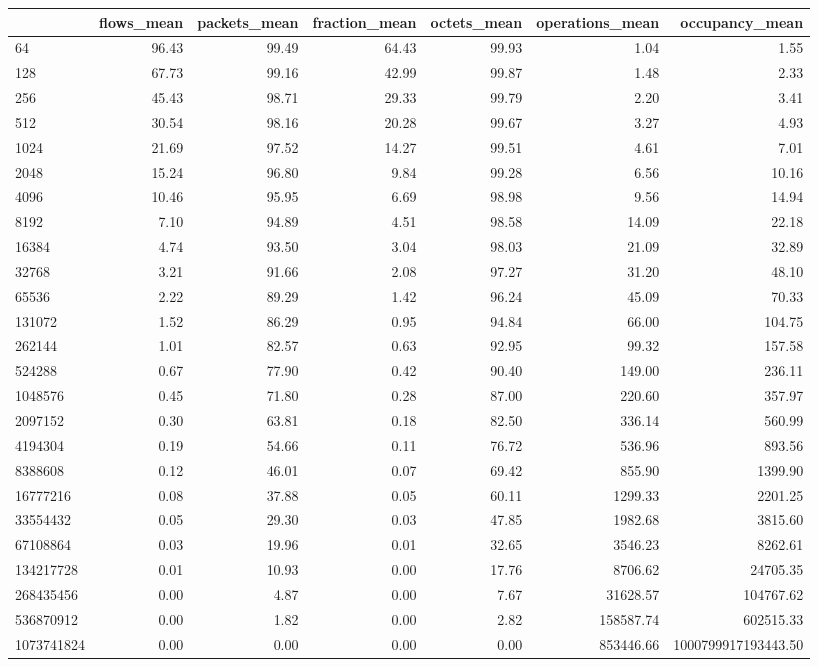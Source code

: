 \begin{tabular}{lrrrrrr}
\toprule
 & flows_mean & packets_mean & fraction_mean & octets_mean & operations_mean & occupancy_mean \\
\midrule
64 & 96.43 & 99.49 & 64.43 & 99.93 & 1.04 & 1.55 \\
128 & 67.73 & 99.16 & 42.99 & 99.87 & 1.48 & 2.33 \\
256 & 45.43 & 98.71 & 29.33 & 99.79 & 2.20 & 3.41 \\
512 & 30.54 & 98.16 & 20.28 & 99.67 & 3.27 & 4.93 \\
1024 & 21.69 & 97.52 & 14.27 & 99.51 & 4.61 & 7.01 \\
2048 & 15.24 & 96.80 & 9.84 & 99.28 & 6.56 & 10.16 \\
4096 & 10.46 & 95.95 & 6.69 & 98.98 & 9.56 & 14.94 \\
8192 & 7.10 & 94.89 & 4.51 & 98.58 & 14.09 & 22.18 \\
16384 & 4.74 & 93.50 & 3.04 & 98.03 & 21.09 & 32.89 \\
32768 & 3.21 & 91.66 & 2.08 & 97.27 & 31.20 & 48.10 \\
65536 & 2.22 & 89.29 & 1.42 & 96.24 & 45.09 & 70.33 \\
131072 & 1.52 & 86.29 & 0.95 & 94.84 & 66.00 & 104.75 \\
262144 & 1.01 & 82.57 & 0.63 & 92.95 & 99.32 & 157.58 \\
524288 & 0.67 & 77.90 & 0.42 & 90.40 & 149.00 & 236.11 \\
1048576 & 0.45 & 71.80 & 0.28 & 87.00 & 220.60 & 357.97 \\
2097152 & 0.30 & 63.81 & 0.18 & 82.50 & 336.14 & 560.99 \\
4194304 & 0.19 & 54.66 & 0.11 & 76.72 & 536.96 & 893.56 \\
8388608 & 0.12 & 46.01 & 0.07 & 69.42 & 855.90 & 1399.90 \\
16777216 & 0.08 & 37.88 & 0.05 & 60.11 & 1299.33 & 2201.25 \\
33554432 & 0.05 & 29.30 & 0.03 & 47.85 & 1982.68 & 3815.60 \\
67108864 & 0.03 & 19.96 & 0.01 & 32.65 & 3546.23 & 8262.61 \\
134217728 & 0.01 & 10.93 & 0.00 & 17.76 & 8706.62 & 24705.35 \\
268435456 & 0.00 & 4.87 & 0.00 & 7.67 & 31628.57 & 104767.62 \\
536870912 & 0.00 & 1.82 & 0.00 & 2.82 & 158587.74 & 602515.33 \\
1073741824 & 0.00 & 0.00 & 0.00 & 0.00 & 853446.66 & 1000799917193443.50 \\
\bottomrule
\end{tabular}
